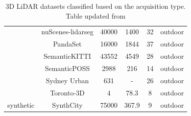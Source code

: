 \begin{table}[h!]
\begin{tabular}{c|c|c|c|c|c}
                                    & nuScenes-lidarseg\cite{caesar2020nuscenes} & 40000 & 1400 & 32& outdoor\\ %
                                    & PandaSet\cite{PandaSet} & 16000 & 1844 & 37 & outdoor \\ %
                                    & SemanticKITTI\cite{Behley_2019_ICCV} & 43552 & 4549 & 28 & outdoor \\ %
                                    & SemanticPOSS\cite{pan2020semanticposs} & 2988 & 216 & 14 & outdoor \\ %
                                    & Sydney Urban\cite{de2013unsupervised} & 631 & - & 26 & outdoor\\ %
                                    & Toronto-3D\cite{tan2020toronto3d} & 4 & 78.3& 8& outdoor\\ %

        \hline
        \multirow{1}{*}{synthetic}  & SynthCity\cite{griffiths2019synthcity} & 75000 & 367.9 & 9 & outdoor \\ %
        \hline
    \end{tabular}
    \caption{3D LiDAR datasets classified based on the acquisition type. Table updated from \cite{survey3d}}
    \label{table:3d_lidar_datasets_table}
\end{table}


